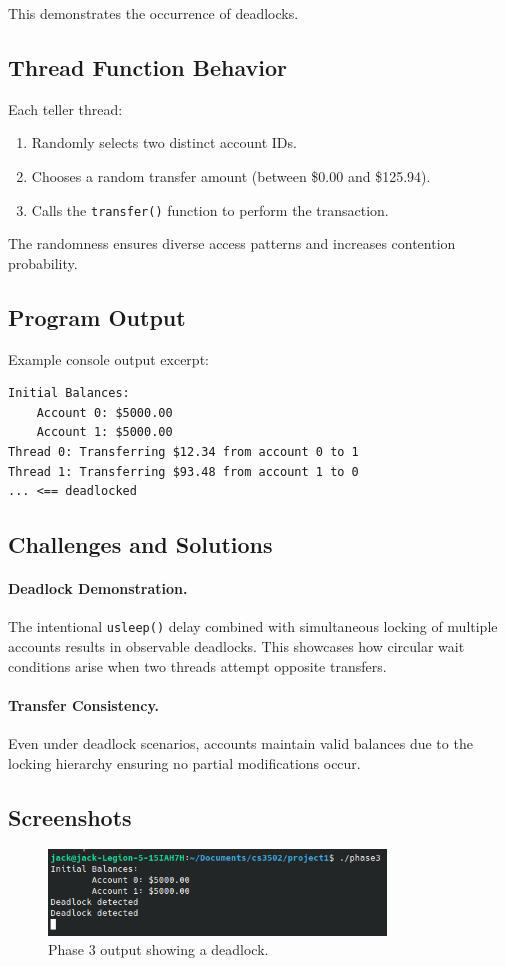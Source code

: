 \documentclass[12pt]{article}
\begin{document}
This demonstrates the occurrence of deadlocks.

\subsection{Thread Function Behavior}
Each teller thread:
\begin{enumerate}
  \item Randomly selects two distinct account IDs.
  \item Chooses a random transfer amount (between \$0.00 and \$125.94).
  \item Calls the \texttt{transfer()} function to perform the transaction.
\end{enumerate}

The randomness ensures diverse access patterns and increases contention probability.

\subsection{Program Output}
Example console output excerpt:
\begin{lstlisting}[caption={Phase 3 Output}]
Initial Balances:
    Account 0: $5000.00
    Account 1: $5000.00
Thread 0: Transferring $12.34 from account 0 to 1
Thread 1: Transferring $93.48 from account 1 to 0
... <== deadlocked

\end{lstlisting}

\subsection{Challenges and Solutions}
\paragraph{Deadlock Demonstration.}
The intentional \texttt{usleep()} delay combined with simultaneous locking of multiple accounts results in observable deadlocks.
This showcases how circular wait conditions arise when two threads attempt opposite transfers.

\paragraph{Transfer Consistency.}
Even under deadlock scenarios, accounts maintain valid balances due to the locking hierarchy ensuring no partial modifications occur.

\subsection{Screenshots}
\begin{figure}[H]
  \centering
  \includegraphics[width=0.8\textwidth]{phase3_deadlock.png}
  \caption{Phase 3 output showing a deadlock.}
\end{figure}
\end{document}
